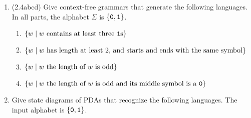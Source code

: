 \documentclass[11pt]{article}
\begin{document}
\begin{enumerate}
\item (2.4abcd) Give context-free grammars that generate the following languages. In all parts, the alphabet $\Sigma$ is $\{{\tt 0},{\tt 1}\}$.
\begin{enumerate}
\item $\{w \mid w \textnormal{ contains at least three {\tt 1}s}\}$
\item $\{w \mid w \textnormal{ has length at least 2, and starts and ends with the same symbol}\}$
\item $\{w \mid w \textnormal{ the length of $w$ is odd}\}$
\item $\{w \mid w \textnormal{ the length of $w$ is odd and its middle symbol is a {\tt 0}}\}$
\end{enumerate}




\item Give state diagrams of PDAs that recognize the following languages.  The input alphabet is $\{{\tt 0},{\tt 1}\}$. 


\end{enumerate}
\end{document}
